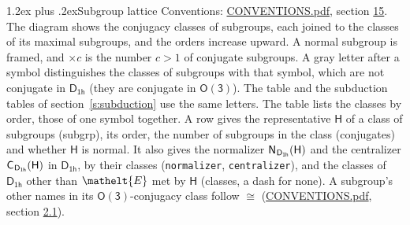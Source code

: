 \documentclass[10pt,a4paper]{article}
\makeatletter
\renewcommand\section{\@startsection{section}{1}{\z@}{-3ex plus -1ex minus -.2ex}%
  {1.2ex plus .2ex}{\normalfont\large\sffamily\bfseries\color{parttitle}}}
\numberwithin{equation}{section}
\newcommand{\eltfont}[1]{{\let\sigma\eltsigma\mathelt{#1}}}
\newcommand{\grp}[1]{\mathsf{#1}}
\newcommand{\cls}[1]{\eltfont{#1}}
\newcommand{\samecls}{\cong}
\newcommand{\clsletter}[1]{\,{\scriptsize\color{black!55}#1}}
\newcommand{\hairsp}{\mkern1mu}
\makeatother
\begin{document}
\section{Subgroup lattice}\label{s:subgroups}
Conventions: \href{../../CONVENTIONS.pdf}{CONVENTIONS.pdf}, section \href{../../CONVENTIONS.pdf\#conv.15}{15}.
The diagram shows the conjugacy classes of subgroups, each joined to the classes of its maximal subgroups, and the orders increase upward. \label{n:index.conjugates.c}A normal subgroup is framed, and ${\times}c$ is the number $c > 1$ of conjugate subgroups. A gray letter after a symbol distinguishes the classes of subgroups with that symbol, which are not conjugate in $\grp{D_{1h}}$ (they are conjugate in \href{O3.pdf}{$\grp{O(3)}$}). The table and the subduction tables of section~\ref{s:subduction} use the same letters. The table lists the classes by order, those of one symbol together. \label{n:group.H}\label{n:head.subgroup}\label{n:head.order}\label{n:head.conjugates}\label{n:head.normal}A row gives the representative $\grp{H}$ of a class of subgroups (subgrp), its order, the number of subgroups in the class (conjugates) and whether $\grp{H}$ is normal. \label{n:group.normalizer}\label{n:group.centralizer}\label{n:head.classes}It also gives the normalizer $\grp{N}_{\hairsp \grp{D_{1h}}}(\grp{H})$ and the centralizer $\grp{C}_{\hairsp \grp{D_{1h}}}(\grp{H})$ in $\grp{D_{1h}}$, by their classes (\texttt{normalizer}, \texttt{centralizer}), and the classes of $\grp{D_{1h}}$ other than $\cls{E}$ met by $\grp{H}$ (classes, a dash for none). A subgroup's other names in its \href{O3.pdf}{$\grp{O(3)}$}-conjugacy class follow $\samecls$ (\href{../../CONVENTIONS.pdf}{CONVENTIONS.pdf}, section \href{../../CONVENTIONS.pdf\#conv.2.1}{2.1}).
\begin{center}
\end{center}
\end{document}
